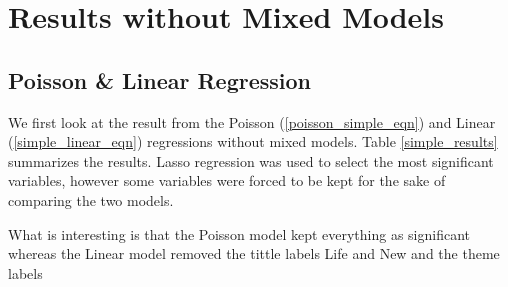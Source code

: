 \section{Results without Mixed Models}
\subsection{Poisson \& Linear Regression}
We first look at the result from the Poisson (\ref{poisson_simple_eqn}) and Linear (\ref{simple_linear_eqn}) regressions without mixed models. Table \ref{simple_results} summarizes the results. Lasso regression was used to select the most significant variables, however some variables were forced to be kept for the sake of comparing the two models.

What is interesting is that the Poisson model kept everything as significant whereas the Linear model removed the tittle labels Life and New and the theme labels 

